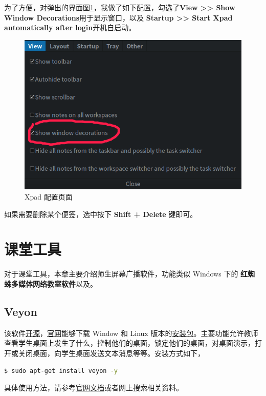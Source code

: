 \documentclass[doctor,openright,twoside]{sjtuthesis}
\theoremstyle{plain}
\theoremstyle{definition}
\theoremstyle{remark}
\theoremstyle{ocrenumbox}
\theoremstyle{plain}
\begin{document}
为了方便，对弹出的界面图\ref{fig:xpad-setwin}，我做了如下配置，勾选了\textbf{View
\textgreater{}\textgreater{} Show Window Decorations}用于显示窗口，以及
\textbf{Startup \textgreater{}\textgreater{} Start Xpad automatically
after login}开机自启动。

\begin{figure}

{\centering \includegraphics[width=0.618\linewidth]{images/education-xpad-setwin} 

}

\caption[Xpad 配置页面]{Xpad 配置页面}\label{fig:xpad-setwin}
\end{figure}

如果需要删除某个便签，选中按下 \textbf{Shift + Delete} 键即可。

\section{课堂工具}

对于课堂工具，本章主要介绍师生屏幕广播软件，功能类似 Windows 下的
\textbf{红蜘蛛多媒体网络教室软件}以及。

\hypertarget{veyon}{%
\subsection{Veyon}\label{veyon}}

该软件\href{https://github.com/veyon/veyon/}{开源}，\href{https://veyon.io/}{官网}能够下载
Window 和 Linux
版本的\href{https://veyon.io/download/}{安装包}。主要功能允许教师查看学生桌面上发生了什么，控制他们的桌面，锁定他们的桌面，对桌面演示，打开或关闭桌面，向学生桌面发送文本消息等等。安装方式如下，

\begin{lstlisting}[language=bash]
$ sudo apt-get install veyon -y
\end{lstlisting}

具体使用方法，请参考\href{https://veyon.io/docs/}{官网文档}或者网上搜索相关资料。
\end{document}
